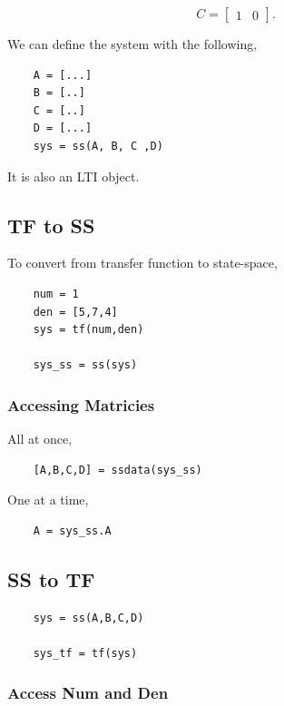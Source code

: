 \documentclass[12pt, a4paper]{report}
\begin{document}
  \[
    C =\begin{bmatrix}
      1 & 0
      \end{bmatrix}
    .\]

  We can define the system with the following,

  \begin{lstlisting}
    A = [...]
    B = [..]
    C = [..]
    D = [...]
    sys = ss(A, B, C ,D)
  \end{lstlisting}

  It is also an LTI object.

  \subsection{TF to SS}


  To convert from transfer function to state-space,

  \begin{lstlisting}
    num = 1
    den = [5,7,4]
    sys = tf(num,den)

    sys_ss = ss(sys)
  \end{lstlisting}

  \subsubsection{Accessing Matricies}

  All at once,

  \begin{lstlisting}
    [A,B,C,D] = ssdata(sys_ss)
  \end{lstlisting}

  One at a time,

  \begin{lstlisting}
    A = sys_ss.A
  \end{lstlisting}

  \subsection{SS to TF}

  \begin{lstlisting}
    sys = ss(A,B,C,D)

    sys_tf = tf(sys)
  \end{lstlisting}

  \subsubsection{Access Num and Den}
\end{document}
